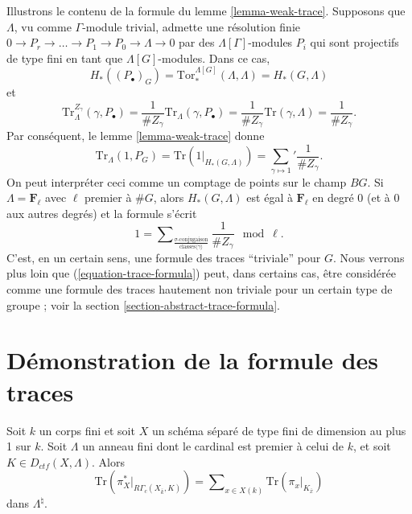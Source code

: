 \begin{remark}
\label{remark-content-trivial-trace}
Illustrons le contenu de la formule du
lemme \ref{lemma-weak-trace}.
Supposons que $\Lambda$, vu comme $\Gamma$-module trivial, admette une
résolution finie
$
0\to P_r\to \ldots \to P_1 \to P_0\to \Lambda\to 0
$
par des $\Lambda[\Gamma]$-modules $P_i$ qui sont projectifs de type fini en tant que
$\Lambda[G]$-modules. Dans ce cas,
$$
H_*\left(\left(P_\bullet\right)_G\right) =
\text{Tor}_*^{\Lambda[G]}\left(\Lambda, \Lambda\right) = H_*(G, \Lambda)
$$
et
$$
\text{Tr}_\Lambda^{Z_\gamma}\left(\gamma, P_\bullet\right) =\frac{1}{\#
Z_\gamma}\text{Tr}_\Lambda(\gamma, P_\bullet)=\frac{1}{\#
Z_\gamma}\text{Tr}(\gamma, \Lambda) = \frac{1}{\# Z_\gamma}.
$$
Par conséquent, le lemme \ref{lemma-weak-trace} donne
$$
\text{Tr}_\Lambda (1 , P_G)
= \text{Tr}\left(1 |_{H_*(G, \Lambda)}\right)
= {\sum_{\gamma\mapsto 1}}'\frac{1}{\# Z_\gamma}.
$$
On peut interpréter ceci comme un comptage de points sur le champ $BG$. Si
$\Lambda = \mathbf{F}_\ell$ avec $\ell$ premier à $\# G$, alors
$H_*(G, \Lambda)$ est égal à $\mathbf{F}_\ell$ en degré 0 (et à $0$ aux
autres degrés) et la formule s'écrit
$$
1 =
\sum\nolimits_{
\frac{\sigma\text{-conjugaison}}{\text{classes}\langle\gamma\rangle}
}
\frac{1}{\# Z_\gamma} \mod \ell.
$$
C'est, en un certain sens, une formule des traces ``triviale'' pour $G$.
Nous verrons plus loin que (\ref{equation-trace-formula}) peut, dans
certains cas, être considérée comme une formule des traces hautement non triviale pour un
certain type de groupe ; voir la
section \ref{section-abstract-trace-formula}.
\end{remark}





\section{Démonstration de la formule des traces}
\label{section-proof-trace-formula}

\begin{theorem}
\label{theorem-trace-formula-again}
Soit $k$ un corps fini et soit $X$ un schéma séparé de type fini de dimension
au plus 1 sur $k$. Soit $\Lambda$ un anneau fini dont le cardinal est premier
à celui de $k$, et soit $K\in D_{ctf}(X, \Lambda)$. Alors
\begin{equation}
\label{equation-trace-formula-again}
\text{Tr}(\pi_X^* |_{R\Gamma_c(X_{\bar k}, K)})
=
\sum\nolimits_{x\in X(k)}
\text{Tr}(\pi_x |_{K_{\bar x}})
\end{equation}
dans $\Lambda^{\natural}$.
\end{theorem}

